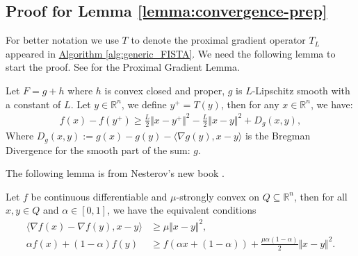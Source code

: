 \subsection{Proof for Lemma \ref*{lemma:convergence-prep}}
    For better notation we use $T$ to denote the proximal gradient operator $T_L$ appeared in \hyperref[alg:generic_FISTA]{Algorithm \ref*{alg:generic_FISTA}}. 
    We need the following lemma to start the proof. 
    See \cite[remark 10.17]{beck_first-order_nodate} for the Proximal Gradient Lemma. 
    
    \begin{lemma}
        Let $F = g + h$ where $h$ is convex closed and proper, $g$ is $L$-Lipschitz smooth with a constant of $L$. Let $y\in \mathbb R^n$, we define $y^+ = T(y)$, then for any $x\in \mathbb R^n$, we have: 
        $$
        \begin{aligned}
        f(x) - f(y^+) \ge \frac{L}{2}\Vert x - y^+\Vert^2 - \frac{L}{2}\Vert x - y\Vert^2 + D_g(x, y),
        \end{aligned}
        $$
        Where $D_g(x, y):= g(x) - g(y) - \langle \nabla g(y), x -y\rangle$ is the Bregman Divergence for the smooth part of the sum: $g$. 
    \end{lemma}
    The following lemma is from Nesterov's new book \cite[thm 2.1.9, (2.1.23)]{nesterov_lectures_2018}. 
    
    \begin{lemma}
        Let $f$ be continuous differentiable and $\mu$-strongly convex on $Q\subseteq \mathbb R^n$, then for all $x, y \in Q$ and $\alpha\in [0, 1]$, we have the equivalent conditions 
        \begin{align}
            \langle \nabla f(x) - \nabla f(y), x - y\rangle &\ge \mu
            \Vert x - y\Vert^2, 
            \\
            \alpha f(x) + (1 - \alpha) f(y) &\ge
            f(\alpha x + (1 - \alpha)) + 
            \frac{\mu \alpha(1 - \alpha)}{2}
            \Vert x - y\Vert^2. 
        \end{align}
    \end{lemma}

